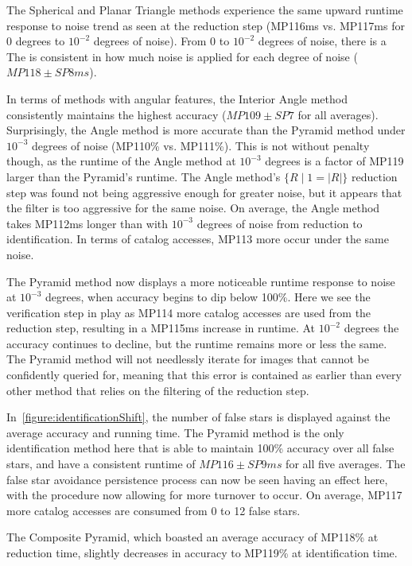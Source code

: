 The Spherical and Planar Triangle methods experience the same upward runtime response to noise trend as seen at the
reduction step (MP116ms vs. MP117ms for 0 degrees to $10^{-2}$ degrees of noise).
From 0 to $10^{-2}$ degrees of noise, there is a
The  is consistent in how much noise is applied for each degree of noise ($MP118 \pm SP8ms$).

In terms of methods with angular features, the Interior Angle method consistently maintains the highest accuracy
($MP109 \pm SP7$ for all averages).
Surprisingly, the Angle method is more accurate than the Pyramid method under $10^{-3}$ degrees
of noise (MP110\% vs. MP111\%).
This is not without penalty though, as the runtime of the Angle method at $10^{-3}$ degrees is a factor of
MP119 larger than the Pyramid's runtime.
The Angle method's $\{ R \mid 1 = |R| \}$ reduction step was found not being aggressive enough for greater noise,
but it appears that the  filter is too aggressive for the same noise.
On average, the Angle method takes MP112ms longer than with $10^{-3}$ degrees of noise from reduction to
identification.
In terms of catalog accesses, MP113 more occur under the same noise.

The Pyramid method now displays a more noticeable runtime response to noise at $10^{-3}$ degrees, when accuracy
begins to dip below 100\%.
Here we see the  verification step in play as MP114 more catalog accesses are used from the reduction
step, resulting in a MP115ms increase in runtime.
At $10^{-2}$ degrees the accuracy continues to decline, but the runtime remains more or less the same.
The Pyramid method will not needlessly iterate for images that cannot be confidently queried for, meaning that this
error is contained as earlier than every other method that relies on the filtering of the reduction step.

In~\autoref{figure:identificationShift}, the number of false stars is displayed against the average accuracy and
running time.
The Pyramid method is the only identification method here that is able to maintain 100\% accuracy over all false stars,
and have a consistent runtime of $MP116 \pm SP9ms$ for all five averages.
The false star avoidance persistence process can now be seen having an effect here, with the 
procedure now allowing for more turnover to occur.
On average, MP117 more catalog accesses are consumed from 0 to 12 false stars.

The Composite Pyramid, which boasted an average accuracy of MP118\% at reduction time, slightly decreases in accuracy
to MP119\% at identification time.

